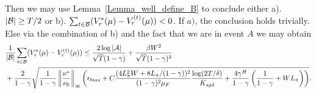     Then we may use Lemma~\ref{Lemma_well_define_B} to conclude either a). $|{\mathcal{B}}|\geq T/2$ or b). $\sum_{t\in{\mathcal{B}}}(V_r^*(\mu)-V_r^{(t)}(\mu))< 0$.
    If $a)$, the conclusion holds trivially.
    Else via the combination of b) and the fact that we are in event $A$ we may obtain
$$
    \begin{aligned}
        &\frac{1}{|{\mathcal{B}}|}\sum_{t\in{\mathcal{B}}}(V_r^*(\mu)-V_r^{(t)}(\mu)) \leq \frac{2\log|{\mathcal{A}}|}{\sqrt{T}(1-\gamma)}+\frac{\beta W^2}{\sqrt{T}(1-\gamma)^3}\\
       &+\frac{2}{1-\gamma}\sqrt{\frac{1}{1-\gamma}\left\|\frac{\nu^*}{\nu_0}\right\|_\infty\left(\epsilon_{bias}+C\frac{(4L_\pi^2W+8L_\pi/(1-\gamma))^2}{(1-\gamma)^2\mu_F}\frac{\log(2T/\delta)}{K_{sgd}}+\frac{4\gamma^H}{1-\gamma}\left(\frac{1}{1-\gamma}+WL_\pi\right)\right)}.
    \end{aligned}
    $$
    
\endproof

